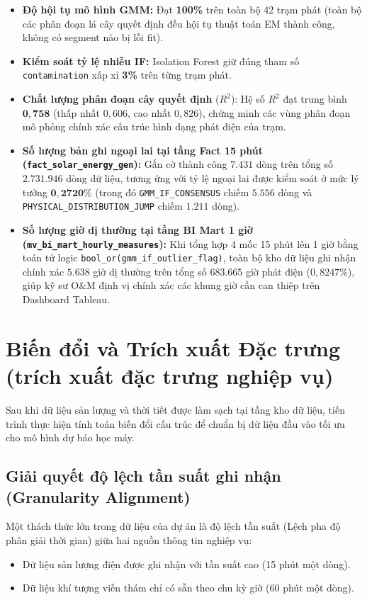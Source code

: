 \documentclass[12pt, a4paper]{report}
\begin{document}
\begin{itemize}
    \item \textbf{Độ hội tụ mô hình GMM:} Đạt \textbf{100\%} trên toàn bộ 42 trạm phát (toàn bộ các phân đoạn lá cây quyết định đều hội tụ thuật toán EM thành công, không có segment nào bị lỗi fit).
    \item \textbf{Kiểm soát tỷ lệ nhiễu IF:} Isolation Forest giữ đúng tham số \texttt{contamination} xấp xỉ \textbf{3\%} trên từng trạm phát.
    \item \textbf{Chất lượng phân đoạn cây quyết định} ($R^2$): Hệ số $R^2$ đạt trung bình $\mathbf{0{,}758}$ (thấp nhất $0{,}606$, cao nhất $0{,}826$), chứng minh các vùng phân đoạn mô phỏng chính xác cấu trúc hình dạng phát điện của trạm.
    \item \textbf{Số lượng bản ghi ngoại lai tại tầng Fact 15 phút (\texttt{fact\_solar\_energy\_gen}):} Gắn cờ thành công $\mathbf{7.431}$ dòng trên tổng số $\mathbf{2.731.946}$ dòng dữ liệu, tương ứng với tỷ lệ ngoại lai được kiểm soát ở mức lý tưởng $\mathbf{0{,}2720\%}$ (trong đó \texttt{GMM\_IF\_CONSENSUS} chiếm $5.556$ dòng và \texttt{PHYSICAL\_DISTRIBUTION\_JUMP} chiếm $1.211$ dòng).
    \item \textbf{Số lượng giờ dị thường tại tầng BI Mart 1 giờ (\texttt{mv\_bi\_mart\_hourly\_measures}):} Khi tổng hợp 4 mốc 15 phút lên 1 giờ bằng toán tử logic \texttt{bool\_or(gmm\_if\_outlier\_flag)}, toàn bộ kho dữ liệu ghi nhận chính xác $\mathbf{5.638}$ giờ dị thường trên tổng số $\mathbf{683.665}$ giờ phát điện ($0{,}8247\%$), giúp kỹ sư O\&M định vị chính xác các khung giờ cần can thiệp trên Dashboard Tableau.
\end{itemize}

\section{Biến đổi và Trích xuất Đặc trưng (trích xuất đặc trưng nghiệp vụ)}
\label{sec:transformation}

Sau khi dữ liệu sản lượng và thời tiết được làm sạch tại tầng kho dữ liệu, tiến trình thực hiện tính toán biến đổi cấu trúc để chuẩn bị dữ liệu đầu vào tối ưu cho mô hình dự báo học máy.

\subsection{Giải quyết độ lệch tần suất ghi nhận (Granularity Alignment)}
Một thách thức lớn trong dữ liệu của dự án là độ lệch tần suất (Lệch pha độ phân giải thời gian) giữa hai nguồn thông tin nghiệp vụ:
\begin{itemize}
    \item Dữ liệu sản lượng điện được ghi nhận với tần suất cao (15 phút một dòng).
    \item Dữ liệu khí tượng viễn thám chỉ có sẵn theo chu kỳ giờ (60 phút một dòng).
\end{itemize}
\end{document}
